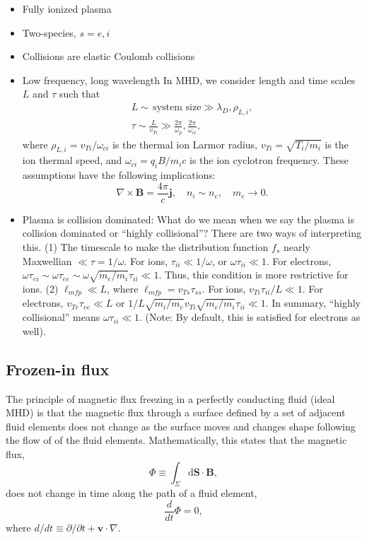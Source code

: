 	\begin{itemize}
			
		\item Fully ionized plasma
		\item Two-species, $s=e,i$
		\item Collisions are elastic Coulomb collisions
		\item{Low frequency, long wavelength}
		In MHD, we consider length and time scales $L$ and $\tau$ such that 
		\begin{align}
			L\sim\,\text{system size}\gg\lambda_D,\rho_{L,i},\\
			\tau\sim\frac{L}{v_{Ti}}\gg\frac{2\pi}{\omega_p},\frac{2\pi}{\omega_{ci}},
		\end{align}
		where $\rho_{L,i}=v_{Ti}/\omega_{ci}$ is the thermal ion Larmor radius, $v_{Ti}=\sqrt{T_i/m_i}$ is the ion thermal speed, and $\omega_{ci}=q_iB/m_ic$ is the ion cyclotron frequency. These assumptions have the following implications:
		\begin{equation}
			\nabla\times\mathbf{B} = \frac{4\pi}{c}\mathbf{j},\quad n_i\sim n_e,\quad m_e\to0.
		\end{equation}
		\item{Plasma is collision dominated:}
		What do we mean when we say the plasma is collision dominated or ``highly collisional''? There are two ways of interpreting this. (1) The timescale to make the distribution function $f_s$ nearly Maxwellian $\ll\tau=1/\omega$. For ions, $\tau_{ii}\ll 1/\omega$, or $\omega\tau_{ii}\ll 1$. For electrons, $\omega\tau_{ei}\sim\omega\tau_{ee}\sim\omega\sqrt{m_e/m_i}\tau_{ii}\ll 1$. Thus, this condition is more restrictive for ions. (2) $\ell_{mfp}\ll L$, where $\ell_{mfp}=v_{Ts}\tau_{ss}$. For ions, $v_{Ti}\tau_{ii}/L\ll 1$. For electrons, $v_{Te}\tau_{ee}\ll L$ or $1/L\sqrt{m_i/m_e}v_{Ti}\sqrt{m_e/m_i}\tau_{ii}\ll 1$. In summary, ``highly collisional'' means $\omega\tau_{ii}\ll 1$. (Note: By default, this is satisfied for electrons as well).

	\end{itemize}

	\subsection{Frozen-in flux}

	The principle of magnetic flux freezing in a perfectly conducting fluid (ideal MHD) is that the magnetic flux through a surface defined by a set of adjacent fluid elements does not change as the surface moves and changes shape following the flow of of the fluid elements. Mathematically, this states that the magnetic flux,
	\begin{equation}
		\Phi\equiv\int_{\Sigma}\mathrm{d}\mathbf{S}\cdot\mathbf{B},
	\end{equation}
	does not change in time along the path of a fluid element,
	\begin{equation}
		\frac{d}{dt}\Phi = 0,
	\end{equation}
	where $d/dt\equiv\partial/\partial t+\mathbf{v}\cdot\nabla$.

